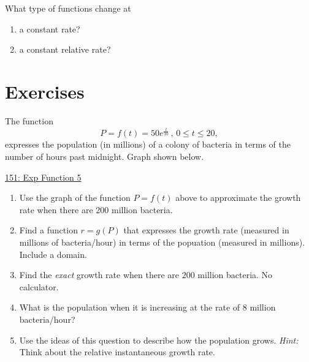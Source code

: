 \documentclass{ximera}
\begin{document}
\begin{question}  \label{Qlgkfglbnbn}
What type of functions change at 
\begin{enumerate}
\item a constant rate?

\item a constant relative rate?
\end{enumerate}
\end{question}

\section{Exercises}

\begin{question} \label{Q677543345}
The function 
\[
     P = f(t) = 50 e^{\frac{t}{10}} \, , \, 0\leq t \leq 20 ,
\]
expresses the population (in millions) of a colony of bacteria in terms of the number of hours past  midnight. Graph shown below.

\begin{onlineOnly}
    \begin{center}
\end{center}
\end{onlineOnly}

\href{https://www.desmos.com/calculator/kffjsoepmo}{151: Exp Function 5}


\begin{enumerate}

\item Use the graph of the function $P=f(t)$ above to approximate the growth rate when there are $200$ million bacteria.

\item Find a function $r=g(P)$ that expresses the growth rate (measured in millions of bacteria/hour) in terms of the popuation (measured in millions). Include a domain.

\item Find the \emph{exact} growth rate when there are $200$ million bacteria. No calculator.

\item What is the population when it is increasing at the rate of $8$ million bacteria/hour?

\item Use the ideas of this question to describe how the population grows. \emph{Hint:} Think about the relative instantaneous growth rate.

\end{enumerate}
\end{question}
\end{document}
